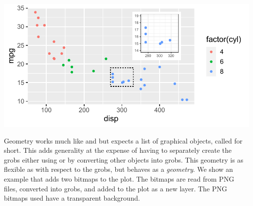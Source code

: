 \documentclass[krantz2]{krantz}\usepackage{knitr}
\begin{document}
\begin{knitrout}
{\centering \includegraphics[width=.7\textwidth]{figure/pos-plot-plot-03-1} 

}


\end{knitrout}
Geometry  works much like  and  but expects a list of  graphical objects, called  for short. This adds generality at the expense of having to separately create the grobs either using  or by converting other objects into grobs. This geometry is as flexible as  with respect to the grobs, but behaves as a \emph{geometry}. We show an example that adds two bitmaps to the plot. The bitmaps are read from PNG files, converted into grobs, and added to the plot as a new layer. The PNG bitmaps used have a transparent background.
\end{document}
